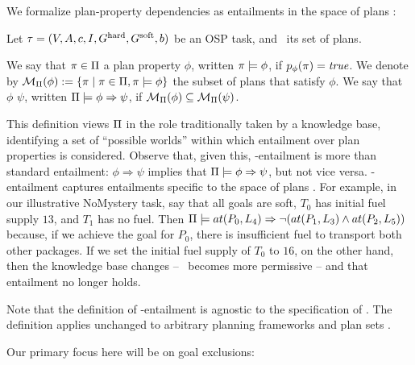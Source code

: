 We formalize plan-property dependencies as entailments in the space of
plans \plans:

\begin{definition}
\label{def:pi-entailment}
Let $\tau =
(V,\allowbreak A,\allowbreak{\ensuremath{c}},\allowbreak I,\allowbreak G^{\text{\textup{hard}}},\allowbreak G^{\text{\textup{soft}}},\allowbreak{\ensuremath{b}})$
be an OSP task, and \plans\ its set of plans.

We say that $\pi \in \Pi$  a plan property
$\phi$, written $\pi \models \phi$, if $p_\phi(\pi) =
\mathit{true}$. We denote by ${\cal M}_{\Pi}(\phi) := \{\pi \mid \pi
\in \Pi, \pi \models \phi\}$ the subset of plans that satisfy
$\phi$.
%
%
We say that $\phi$  $\psi$, written
$\Pi \models \phi \Rightarrow \psi$, if ${\cal M}_{\Pi}(\phi) \subseteq
{\cal M}_{\Pi}(\psi)$.
%
\end{definition}

This definition views $\Pi$ in the role traditionally taken by a
knowledge base, identifying a set of ``possible worlds'' within which
entailment over plan properties is considered.
%
Observe that, given this, \plans-entailment is more than standard
entailment: $\phi \Rightarrow \psi$ implies that
$\Pi \models \phi \Rightarrow \psi$, but not vice versa. \plans-entailment
captures entailments specific to the space of plans \plans. For
example, in our illustrative NoMystery task, say that all goals are
soft, $T_0$ has initial fuel supply $13$, and $T_1$ has no fuel. Then
$\Pi \models at(P_0,L_4) \Rightarrow \neg (at(P_1,L_3) \wedge at(P_2,L_5))$
because, if we achieve the goal for $P_0$, there is insufficient fuel
to transport both other packages. If we set the initial fuel supply of
$T_0$ to $16$, on the other hand, then the knowledge base changes --
\plans\ becomes more permissive -- and that entailment no longer
holds.
%

Note that the definition of \plans-entailment is agnostic to the
specification of \plans. The definition applies unchanged to arbitrary
planning frameworks and plan sets \plans. 
%
%

Our primary focus here will be on goal exclusions:

